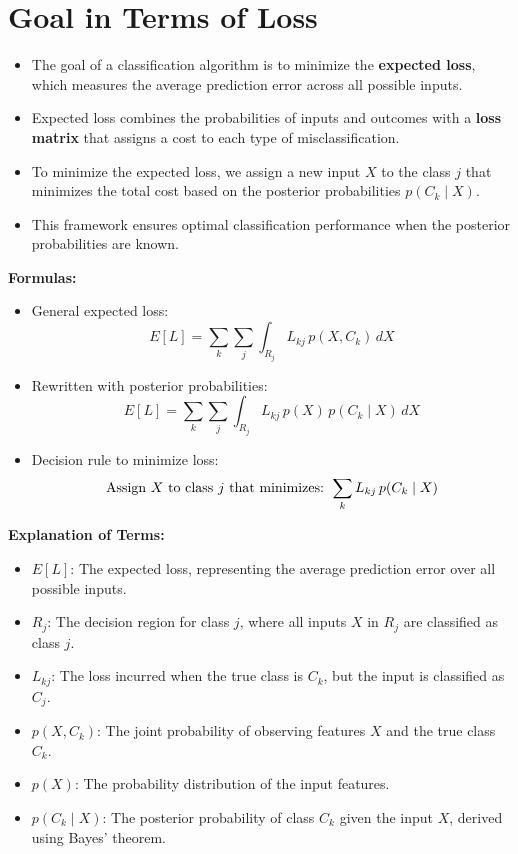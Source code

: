 \documentclass[12pt]{article}
\begin{document}
\section{Goal in Terms of Loss}

\begin{itemize}
    \item The goal of a classification algorithm is to minimize the \textbf{expected loss}, which measures the average prediction error across all possible inputs.
    \item Expected loss combines the probabilities of inputs and outcomes with a \textbf{loss matrix} that assigns a cost to each type of misclassification.
    \item To minimize the expected loss, we assign a new input \( X \) to the class \( j \) that minimizes the total cost based on the posterior probabilities \( p(C_k \mid X) \).
    \item This framework ensures optimal classification performance when the posterior probabilities are known.
\end{itemize}

\textbf{Formulas:}
\begin{itemize}
    \item General expected loss:
    \[
    E[L] = \sum_k \sum_j \int_{R_j} L_{kj} \, p(X, C_k)\, dX
    \]
    \item Rewritten with posterior probabilities:
    \[
    E[L] = \sum_k \sum_j \int_{R_j} L_{kj} \, p(X) \, p(C_k \mid X)\, dX
    \]
    \item Decision rule to minimize loss:
    \[
    \text{Assign \( X \) to class \( j \) that minimizes: } \sum_k L_{kj} \, p(C_k \mid X)
    \]
\end{itemize}

\textbf{Explanation of Terms:}
\begin{itemize}
    \item \( E[L] \): The expected loss, representing the average prediction error over all possible inputs.
    \item \( R_j \): The decision region for class \( j \), where all inputs \( X \) in \( R_j \) are classified as class \( j \).
    \item \( L_{kj} \): The loss incurred when the true class is \( C_k \), but the input is classified as \( C_j \).
    \item \( p(X, C_k) \): The joint probability of observing features \( X \) and the true class \( C_k \).
    \item \( p(X) \): The probability distribution of the input features.
    \item \( p(C_k \mid X) \): The posterior probability of class \( C_k \) given the input \( X \), derived using Bayes' theorem.
\end{itemize}
\end{document}

